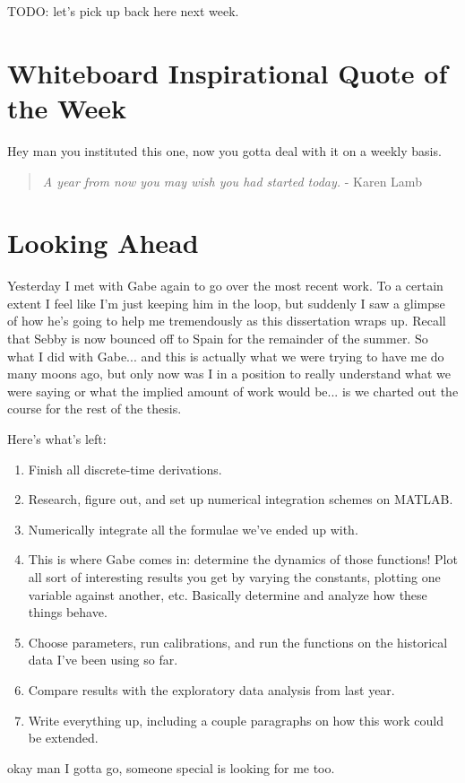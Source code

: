 \documentclass[12pt]{article}
\begin{document}
TODO: let's pick up back here next week.

\section*{Whiteboard Inspirational Quote of the Week}
Hey man you instituted this one, now you gotta deal with it on a weekly basis.
\begin{quote}
\textit{A year from now you may wish you had started today.} - Karen Lamb
\end{quote} 

\section*{Looking Ahead}
Yesterday I met with Gabe again to go over the most recent work. To a certain extent I feel like I'm just keeping him in the loop, but suddenly I saw a glimpse of how he's going to help me tremendously as this dissertation wraps up. Recall that Sebby is now bounced off to Spain for the remainder of the summer. So what I did with Gabe... and this is actually what we were trying to have me do many moons ago, but only now was I in a position to really understand what we were saying or what the implied amount of work would be... is we charted out the course for the rest of the thesis.

Here's what's left:
\begin{enumerate}
\item Finish all discrete-time derivations.
\item Research, figure out, and set up numerical integration schemes on MATLAB.
\item Numerically integrate all the formulae we've ended up with.
\item This is where Gabe comes in: determine the dynamics of those functions! Plot all sort of interesting results you get by varying the constants, plotting one variable against another, etc. Basically determine and analyze how these things behave.
\item Choose parameters, run calibrations, and run the functions on the historical data I've been using so far.
\item Compare results with the exploratory data analysis from last year.
\item Write everything up, including a couple paragraphs on how this work could be extended.
\end{enumerate}



okay man I gotta go, someone special is looking for me too.
\end{document}
